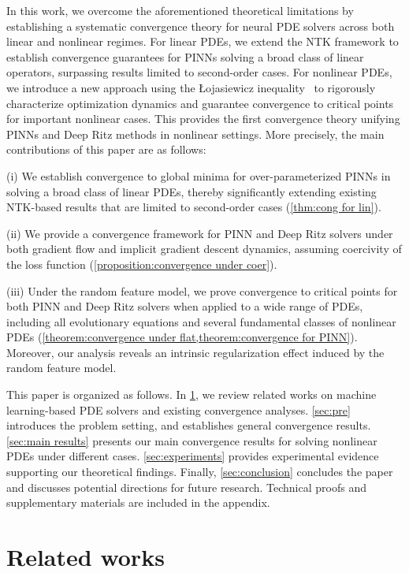 \documentclass{article}
\begin{document}
In this work, we overcome the aforementioned theoretical limitations by establishing a systematic convergence theory for neural PDE solvers across both linear and nonlinear regimes.
For linear PDEs, we extend the NTK framework to establish convergence guarantees for PINNs solving a broad class of linear operators, surpassing results limited to second-order cases. 
For nonlinear PDEs, we introduce a new approach using the \L{}ojasiewicz inequality~\citep{haraux2012some} to rigorously characterize optimization dynamics and guarantee convergence to critical points for important nonlinear cases. 
This provides the first convergence theory unifying PINNs and Deep Ritz methods in nonlinear settings.
More precisely, the main contributions of this paper are as follows:

(i) We establish convergence to global minima for over-parameterized PINNs in solving a broad class of linear PDEs, thereby significantly extending existing NTK-based results that are limited to second-order cases (\cref{thm:cong for lin}).

(ii) We provide a convergence framework for PINN and Deep Ritz solvers under both gradient flow and implicit gradient descent dynamics, assuming coercivity of the loss function (\cref{proposition:convergence under coer}).

(iii) Under the random feature model, we prove convergence to critical points for both PINN and Deep Ritz solvers when applied to a wide range of PDEs, including all evolutionary equations and several fundamental classes of nonlinear PDEs (\cref{theorem:convergence under flat,theorem:convergence for PINN}). 
Moreover, our analysis reveals an intrinsic regularization effect induced by the random feature model.

This paper is organized as follows.  
In \cref{sec:related}, we review related works on machine learning-based PDE solvers and existing convergence analyses.  
\cref{sec:pre} introduces the problem setting, and establishes general convergence results.  
\cref{sec:main results} presents our main convergence results for solving nonlinear PDEs under different cases.  
\cref{sec:experiments} provides experimental evidence supporting our theoretical findings.  
Finally, \cref{sec:conclusion} concludes the paper and discusses potential directions for future research.  
Technical proofs and supplementary materials are included in the appendix.

\section{Related works} \label{sec:related}
\end{document}
